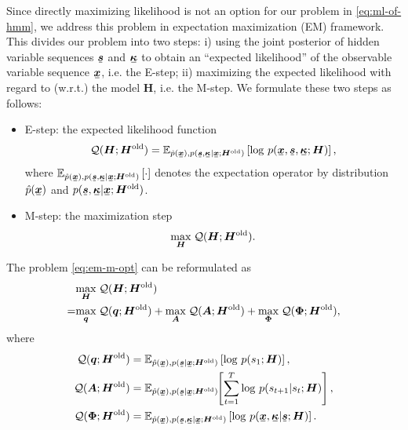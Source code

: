 \documentclass[letterpaper]{article} %
\newcommand{\ubar}[1]{\mkern2mu\underline{\mkern-2mu #1\mkern-2mu}\mkern2mu}
\newcommand{\ubm}[1]{\ubar{\bm{#1}}}
\begin{document}
Since directly maximizing likelihood is not an option for our problem in \ref{eq:ml-of-hmm}, we address this problem in expectation maximization (EM) framework. This divides our problem into two steps: i) using the joint posterior of hidden variable sequences $\ubm{s}$ and $\ubm{\kappa}$ to obtain an ``expected likelihood'' of the observable variable sequence $\ubm{x}$, i.e. the E-step; ii) maximizing the expected likelihood with regard to (w.r.t.) the model $\bm{H}$, i.e. the M-step. We formulate these two steps as follows:
\begin{itemize}
\item E-step: %
  the expected likelihood function
  \begin{equation}\label{eq:em-q-funciton}
    \Qq(\bm{H}; \bm{H}^{\mathrm{old}}) = \EE_{\hat{p}(\ubm{x}),p(\ubm{s},\ubm{\kappa}| \ubm{x}; \bm{H}^{\mathrm{old}})}\left[ \log\,p(\ubm{x}, \ubm{s}, \ubm{\kappa}; \bm{H})\right],
  \end{equation}
  where $\EE_{\hat{p}(\ubm{x}),p(\ubm{s},\ubm{\kappa}| \ubm{x}; \bm{H}^{\mathrm{old}})}\left[ \cdot\right]$ denotes the expectation operator by distribution $\hat{p}(\ubm{x})$ and $p(\ubm{s},\ubm{\kappa}| \ubm{x}; \bm{H}^{\mathrm{old}})$.
\item M-step: the maximization step
  \begin{equation}\label{eq:em-m-opt}
    \underset{\bm{H}}{\max}\; \mathcal{Q}(\bm{H}; \bm{H}^{\mathrm{old}}).
  \end{equation}
\end{itemize}


The problem \eqref{eq:em-m-opt} can be reformulated as
\begin{align}\label{eq:m-step-subs}
  &\underset{\bm{H}}{\max}\; \mathcal{Q}(\bm{H}; \bm{H}^{\mathrm{old}}) \nonumber \\
  =&\underset{\bm{q}}{\max}\;\mathcal{Q}(\bm{q}; \bm{H}^{\mathrm{old}}) + \underset{\bm{A}}{\max}\;\mathcal{Q}(\bm{A}; \bm{H}^{\mathrm{old}}) 
     + \underset{\bm{\Phi}}{\max}\;\mathcal{Q}(\bm{\Phi}; \bm{H}^{\mathrm{old}}),
\end{align}
where
\begin{align}
  \Qq(\bm{q}; \bm{H}^{\mathrm{old}}) 
    &= \EE_{\hat{p}(\ubm{x}),p(\ubm{s}| \ubm{x}; \bm{H}^{\mathrm{old}})} \left[ \log\,p({s}_{1};\bm{H})  \right], \label{eq:init-distribution-update}\\
  \Qq(\bm{A}; \bm{H}^{\mathrm{old}}) &=\EE_{\hat{p}(\ubm{x}),p(\ubm{s}| \ubm{x}; \bm{H}^{\mathrm{old}})}\hspace{-0.1cm}\left[ \sum_{t=1}^{T}\log\,p({s}_{t+1}|{s}_{t}; \bm{H}) \right], \label{eq:transition-update}\\
  \Qq(\bm{\Phi}; \bm{H}^{\mathrm{old}}) &= \EE_{\hat{p}(\ubm{x}),p(\ubm{s},\ubm{\kappa}| \ubm{x}; \bm{H}^{\mathrm{old}})} \left[ \log\,p(\ubm{x}, \ubm{\kappa}| \ubm{s}; \bm{H}) \right]. \label{eq:generative-model-update}
\end{align}
\end{document}
